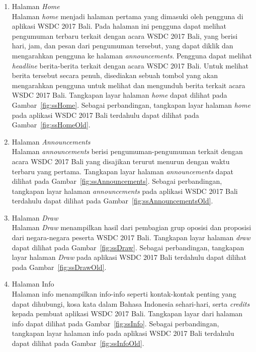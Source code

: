 \begin{enumerate}
	\item Halaman \textit{Home} \\
		Halaman \textit{home} menjadi halaman pertama yang dimasuki oleh pengguna di aplikasi WSDC 2017 Bali. Pada halaman ini pengguna dapat melihat pengumuman terbaru terkait dengan acara WSDC 2017 Bali, yang berisi hari, jam, dan pesan dari pengumuman tersebut, yang dapat diklik dan mengarahkan pengguna ke halaman \textit{announcements}. Pengguna dapat melihat \textit{headline} berita-berita terkait dengan acara WSDC 2017 Bali. Untuk melihat berita tersebut secara penuh, disediakan sebuah tombol yang akan mengarahkan pengguna untuk melihat dan mengunduh berita terkait acara WSDC 2017 Bali. Tangkapan layar halaman \textit{home} dapat dilihat pada Gambar~\ref{fig:ssHome}. Sebagai perbandingan, tangkapan layar halaman \textit{home} pada aplikasi WSDC 2017 Bali terdahulu dapat dilihat pada Gambar~\ref{fig:ssHomeOld}.
		
\newpage		
		
	\item Halaman \textit{Announcements} \\
		Halaman \textit{announcements} berisi pengumuman-pengumuman terkait dengan acara WSDC 2017 Bali yang disajikan terurut menurun dengan waktu terbaru yang pertama. Tangkapan layar halaman \textit{announcements} dapat dilihat pada Gambar~\ref{fig:ssAnnouncements}. Sebagai perbandingan, tangkapan layar halaman \textit{announcements} pada aplikasi WSDC 2017 Bali terdahulu dapat dilihat pada Gambar~\ref{fig:ssAnnouncementsOld}.
	
	\item Halaman \textit{Draw} \\
		Halaman \textit{Draw} menampilkan hasil dari pembagian grup oposisi dan proposisi dari negara-negara peserta WSDC 2017 Bali. Tangkapan layar halaman \textit{draw} dapat dilihat pada Gambar~\ref{fig:ssDraw}. Sebagai perbandingan, tangkapan layar halaman \textit{Draw} pada aplikasi WSDC 2017 Bali terdahulu dapat dilihat pada Gambar~\ref{fig:ssDrawOld}.
		
	\item Halaman Info \\
		Halaman info menampilkan info-info seperti kontak-kontak penting yang dapat dihubungi, kosa kata dalam Bahasa Indonesia sehari-hari, serta {\it credits} kepada pembuat aplikasi WSDC 2017 Bali. Tangkapan layar dari halaman info dapat dilihat pada Gambar~\ref{fig:ssInfo}. Sebagai perbandingan, tangkapan layar halaman info pada aplikasi WSDC 2017 Bali terdahulu dapat dilihat pada Gambar~\ref{fig:ssInfoOld}.
		

\end{enumerate}
